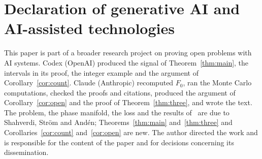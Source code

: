 \documentclass[11pt]{article}
\theoremstyle{remark}
\begin{document}
\section*{Declaration of generative AI and AI-assisted technologies}
This paper is part of a broader research project on proving open problems with AI systems. Codex (OpenAI) produced the signal of Theorem~\ref{thm:main}, the intervals in its proof, the integer example and the argument of Corollary~\ref{cor:count}. Claude (Anthropic) recomputed $F_0$, ran the Monte Carlo computations, checked the proofs and citations, produced the argument of Corollary~\ref{cor:open} and the proof of Theorem~\ref{thm:three}, and wrote the text. The problem, the phase manifold, the loss and the results of~\cite{SSA24} are due to Shahverdi, Str\"om and And\'en; Theorems~\ref{thm:main} and~\ref{thm:three} and Corollaries~\ref{cor:count} and~\ref{cor:open} are new. The author directed the work and is responsible for the content of the paper and for decisions concerning its dissemination.
\end{document}

